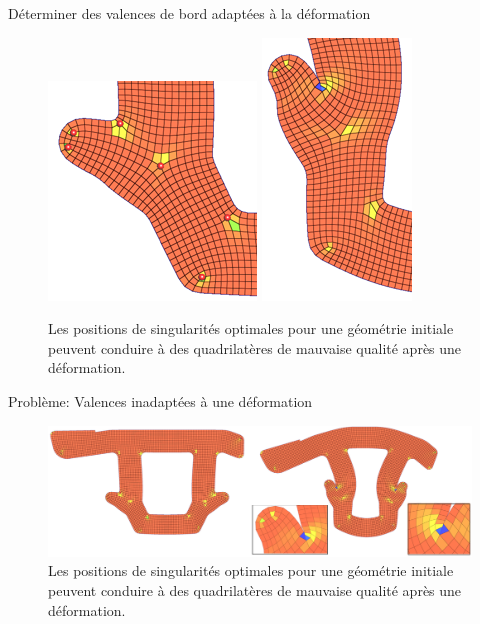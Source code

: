 \begin{frame}{Déterminer des valences de bord adaptées à la déformation}
    \small
    \begin{figure}
        \centering
        \includegraphics[width=0.46\linewidth]{img/quadsimu/coin_pb_0.PNG}
        \includegraphics[width=0.27\linewidth]{img/quadsimu/coin_pb_1.PNG}
        \caption{Les positions de singularités optimales pour une géométrie initiale peuvent conduire à des quadrilatères de mauvaise qualité après une déformation.}
        \label{fig:asp_ratio_pb}
    \end{figure}
\end{frame}
\fi
\begin{frame}{Problème: Valences inadaptées à une déformation}
    \begin{figure}
        \centering
        \includegraphics[width=\linewidth]{img/new_images/echec_simu.PNG}
        \caption{Les positions de singularités optimales pour une géométrie initiale peuvent conduire à des quadrilatères de mauvaise qualité après une déformation.}
    \end{figure}
\end{frame}
